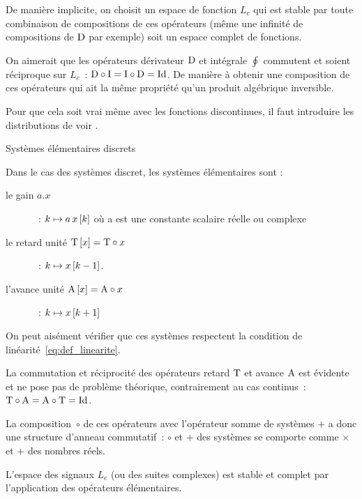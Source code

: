\begin{remarque}
  De manière implicite, on choisit un espace de fonction $L_c$ qui est
  stable par toute combinaison de compositions de ces opérateurs (même
  une infinité de compositions de $\mathrm{D}$ par exemple) soit un espace
  complet de fonctions.

  On aimerait que les opérateurs dérivateur $\mathrm{D}$ et intégrale
  $\oint$ commutent et soient réciproque sur $L_c$~:
  $\mathrm{D}\circ\mathrm{I}=\mathrm{I}\circ\mathrm{D}=\mathrm{Id}$. De manière à obtenir une
  composition de ces opérateurs qui ait la même propriété qu'un
  produit algébrique inversible.
  
  Pour que cela soit vrai même avec les fonctions discontinues, il
  faut introduire les distributions de \Dirac{} voir
  .
\end{remarque}

\begin{definition}{Systèmes élémentaires discrets}
  
  Dans le cas des systèmes discret, les systèmes élémentaires sont :
  \begin{description}
  \item[le gain $a.x$]~: $ k \mapsto a\,x\left[k\right]$ où a est une constante
    scalaire réelle ou complexe
  \item[le retard unité $\mathrm{T}\left[x\right]=\mathrm{T}\circ x$]~:
    $ k \mapsto x\left[k-1\right]$.
  \item[l'avance unité $\mathrm{A}\left[x\right]=\mathrm{A}\circ x$]~:
    $ k \mapsto x\left[k+1\right] $
  \end{description}
\end{definition}

On peut aisément vérifier que ces systèmes respectent la condition de
linéarité~\ref{eq:def_linearite}.

\begin{remarque}
  La commutation et réciprocité des opérateurs retard $\mathrm{T}$ et
  avance $\mathrm{A}$ est évidente et ne pose pas de problème théorique,
  contrairement au cas continus~:
  $\mathrm{T}\circ\mathrm{A}=\mathrm{A}\circ\mathrm{T}=\mathrm{Id}$.

  La composition~$\circ$ de ces opérateurs avec l'opérateur somme de
  systèmes $+$ a donc une structure d'anneau commutatif~: $\circ$ et
  $+$ des systèmes se comporte comme $\times$ et $+$ des nombres
  réels.

  L'espace des signaux $L_e$ (ou des suites complexes) est stable et
  complet par l'application des opérateurs élémentaires.
\end{remarque}

